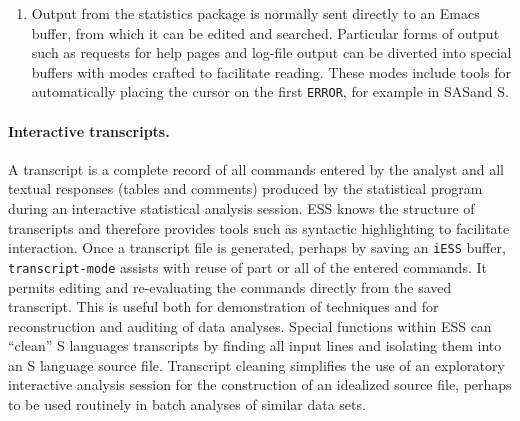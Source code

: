 \documentclass{article}
\newcommand*{\SAS}{\textsc{SAS}}
\newcommand{\stexttt}[1]{{\small\texttt{#1}}}
\begin{document}
\begin{enumerate}
\item Output from the statistics package is normally sent directly to
  an Emacs buffer, from which it can be edited and searched.
  Particular forms of output such as requests for help pages and
  log-file output can be diverted into special buffers with modes
  crafted to facilitate reading.   These modes include tools for 
  automatically placing the cursor on the first \stexttt{ERROR}, for example in \SAS and S. %


\end{enumerate}

\paragraph{Interactive transcripts.}
A transcript is a complete record of all commands entered by the
analyst and all textual responses (tables and comments) produced by
the statistical program during an interactive statistical analysis
session.  ESS knows the structure of transcripts and therefore
provides tools such as syntactic highlighting to facilitate
interaction.
Once a transcript file is generated, perhaps by saving an
\stexttt{iESS} buffer, \stexttt{transcript-mode} assists with reuse of
part or all of the entered commands.  It permits editing and
re-evaluating the commands directly from the saved transcript.  This
is useful both for demonstration of techniques and for reconstruction
and auditing of data analyses.  Special functions within ESS can
``clean'' S languages transcripts by finding all input lines and
isolating them into an S language source file.  Transcript cleaning
simplifies the use of an exploratory interactive analysis session for
the construction of an idealized source file, perhaps to be used
routinely in batch analyses of similar data sets.
\end{document}
